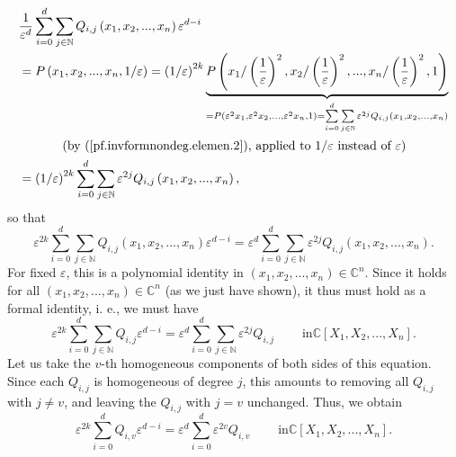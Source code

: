 \documentclass
[numbers=enddot,12pt,final,onecolumn,german,notitlepage]{scrartcl}%
\theoremstyle{definition}
\begin{document}
\begin{align*}
&  \dfrac{1}{\varepsilon^{d}}\sum\limits_{i=0}^{d}\sum\limits_{j\in\mathbb{N}%
}Q_{i,j}\left(  x_{1},x_{2},...,x_{n}\right)  \varepsilon^{d-i}\\
&  =P\left(  x_{1},x_{2},...,x_{n},1/\varepsilon\right)  =\left(
1/\varepsilon\right)  ^{2k}\underbrace{P\left(  x_{1}/\left(  \dfrac
{1}{\varepsilon}\right)  ^{2},x_{2}/\left(  \dfrac{1}{\varepsilon}\right)
^{2},...,x_{n}/\left(  \dfrac{1}{\varepsilon}\right)  ^{2},1\right)
}_{=P\left(  \varepsilon^{2}x_{1},\varepsilon^{2}x_{2},...,\varepsilon
^{2}x_{n},1\right)  =\sum\limits_{i=0}^{d}\sum\limits_{j\in\mathbb{N}%
}\varepsilon^{2j}Q_{i,j}\left(  x_{1},x_{2},...,x_{n}\right)  }\\
&  \ \ \ \ \ \ \ \ \ \ \left(  \text{by (\ref{pf.invformnondeg.elemen.2}),
applied to }1/\varepsilon\text{ instead of }\varepsilon\right) \\
&  =\left(  1/\varepsilon\right)  ^{2k}\sum\limits_{i=0}^{d}\sum
\limits_{j\in\mathbb{N}}\varepsilon^{2j}Q_{i,j}\left(  x_{1},x_{2}%
,...,x_{n}\right)  ,
\end{align*}
so that%
\[
\varepsilon^{2k}\sum\limits_{i=0}^{d}\sum\limits_{j\in\mathbb{N}}%
Q_{i,j}\left(  x_{1},x_{2},...,x_{n}\right)  \varepsilon^{d-i}=\varepsilon
^{d}\sum\limits_{i=0}^{d}\sum\limits_{j\in\mathbb{N}}\varepsilon^{2j}%
Q_{i,j}\left(  x_{1},x_{2},...,x_{n}\right)  .
\]
For fixed $\varepsilon$, this is a polynomial identity in $\left(  x_{1}%
,x_{2},...,x_{n}\right)  \in\mathbb{C}^{n}$. Since it holds for all $\left(
x_{1},x_{2},...,x_{n}\right)  \in\mathbb{C}^{n}$ (as we just have shown), it
thus must hold as a formal identity, i. e., we must have%
\[
\varepsilon^{2k}\sum\limits_{i=0}^{d}\sum\limits_{j\in\mathbb{N}}%
Q_{i,j}\varepsilon^{d-i}=\varepsilon^{d}\sum\limits_{i=0}^{d}\sum
\limits_{j\in\mathbb{N}}\varepsilon^{2j}Q_{i,j}\ \ \ \ \ \ \ \ \ \ \text{in
}\mathbb{C}\left[  X_{1},X_{2},...,X_{n}\right]  .
\]
Let us take the $v$-th homogeneous components of both sides of this equation.
Since each $Q_{i,j}$ is homogeneous of degree $j$, this amounts to removing
all $Q_{i,j}$ with $j\neq v$, and leaving the $Q_{i,j}$ with $j=v$ unchanged.
Thus, we obtain%
\begin{equation}
\varepsilon^{2k}\sum\limits_{i=0}^{d}Q_{i,v}\varepsilon^{d-i}=\varepsilon
^{d}\sum\limits_{i=0}^{d}\varepsilon^{2v}Q_{i,v}\ \ \ \ \ \ \ \ \ \ \text{in
}\mathbb{C}\left[  X_{1},X_{2},...,X_{n}\right]  .
\label{pf.invformnondeg.elemen.6}%
\end{equation}
\end{document}
